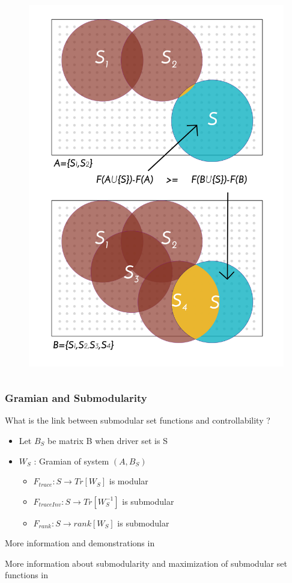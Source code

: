 \documentclass[xcolor=dvipsnames]{beamer}
\begin{document}
\begin{frame}
\begin{columns}
\begin{column}{.4\textwidth}
\begin{figure}
				\includegraphics[scale=.25]{figure_1}
			\end{figure}	
		\end{column}
	\end{columns}
\end{frame}

\begin{frame}
	\frametitle{Gramian and Submodularity}

	What is the link between submodular set functions and controllability ?
	\begin{itemize}
		\item Let $B_S$ be matrix B when driver set is S
		\item $W_S $ : Gramian of system $ (A,B_S) $ 	
		\begin{itemize}
			\item $F_{trace}:S \longrightarrow Tr[W_S] $ is modular
			\item $F_{traceInv}:S \longrightarrow Tr[W_S^{-1}] $ is submodular
			\item $F_{rank}:S \longrightarrow rank[W_S] $ is submodular
		\end{itemize}	
	\end{itemize}

	More information and demonstrations in 
	
	More information about submodularity and maximization of submodular set functions in 	
\end{frame}
\end{document}
